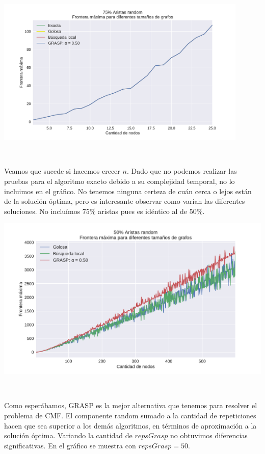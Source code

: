 {\centering
    \includegraphics[width=0.9\textwidth]{informe/imgs/exp_random75_frontera_todos_v2.pdf}

}
$ $ \newline

Veamos que sucede si hacemos crecer $n$. Dado que no podemos realizar las pruebas para el algoritmo exacto debido a su complejidad temporal, no lo incluimos en el gráfico. No tenemos ninguna certeza de cuán cerca o lejos están de la solución óptima, pero es interesante observar como varían las diferentes soluciones. No incluímos 75\% aristas pues es idéntico al de 50\%. \\

{\centering
    \includegraphics[width=1\textwidth]{informe/imgs/exp_random50_frontera_todos_ngrande.pdf}

}
$ $ \newline

Como esperábamos, GRASP es la mejor alternativa que tenemos para resolver el problema de CMF. El componente random sumado a la cantidad de repeticiones hacen que sea superior a los demás algoritmos, en términos de aproximación a la solución óptima. Variando la cantidad de $repsGrasp$ no obtuvimos diferencias significativas. En el gráfico se muestra con $repsGrasp = 50$. \\

